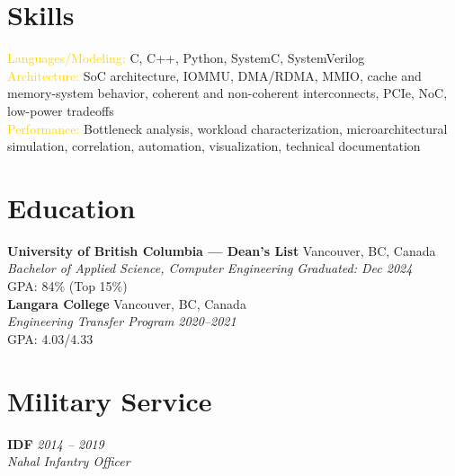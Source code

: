 \documentclass[11pt]{article}
\newcommand{\gold}[1]{\textcolor{gold}{#1}}
\newcommand{\resumeSubheading}[4]{%
  \textbf{#1} \hfill #2\\
  \textit{#3} \hfill \textit{#4}\\
}
\begin{document}
\section{Skills}
\gold{Languages/Modeling:} C, C++, Python, SystemC, SystemVerilog\\
\gold{Architecture:} SoC architecture, IOMMU, DMA/RDMA, MMIO, cache and memory-system behavior, coherent and non-coherent interconnects, PCIe, NoC, low-power tradeoffs\\
\gold{Performance:} Bottleneck analysis, workload characterization, microarchitectural simulation, correlation, automation, visualization, technical documentation

\section{Education}
\resumeSubheading{University of British Columbia --- Dean's List}{Vancouver, BC, Canada}{Bachelor of Applied Science, Computer Engineering}{Graduated: Dec 2024}
GPA: 84\% (Top 15\%)\\
\resumeSubheading{Langara College}{Vancouver, BC, Canada}{Engineering Transfer Program}{2020--2021}
GPA: 4.03/4.33

\section{Military Service}
\textbf{IDF} \hfill \textit{2014 -- 2019}\\
\textit{Nahal Infantry Officer}
\end{document}
